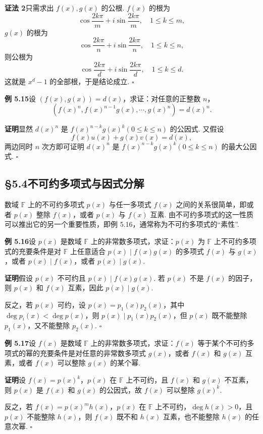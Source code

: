 \documentclass[UTF8, 12pt, fontset=fandol, oneside]{ctexart}
\begin{document}
\noindent\textbf{证法 2}\quad 只需求出 $f(x),g(x)$ 的公根. $f(x)$ 的根为
\[
\cos\frac{2k\pi}{m}+i\sin\frac{2k\pi}{m},\quad 1\le k\le m,
\]
$g(x)$ 的根为
\[
\cos\frac{2k\pi}{n}+i\sin\frac{2k\pi}{n},\quad 1\le k\le n,
\]
则公根为
\[
\cos\frac{2k\pi}{d}+i\sin\frac{2k\pi}{d},\quad 1\le k\le d.
\]
这就是 $x^d-1$ 的全部根，于是结论成立. \hfill $\square$

\noindent\textbf{例 5.15}\quad 设 $(f(x),g(x))=d(x)$，求证：对任意的正整数 $n$，
\[
(f(x)^n,f(x)^{n-1}g(x),\cdots,g(x)^n)=d(x)^n.
\]

\noindent\textbf{证明}\quad 显然 $d(x)^n$ 是 $f(x)^{n-k}g(x)^k(0\le k\le n)$ 的公因式. 又假设
\[
f(x)u(x)+g(x)v(x)=d(x),
\]
两边同时 $n$ 次方即可证明 $d(x)^n$ 是 $f(x)^{n-k}g(x)^k(0\le k\le n)$ 的最大公因式. \hfill $\square$

\subsection*{§5.4\quad 不可约多项式与因式分解}

数域 $\mathbb{F}$ 上的不可约多项式 $p(x)$ 与任一多项式 $f(x)$ 之间的关系很简单，即或者 $p(x)$ 整除 $f(x)$，或者 $p(x)$ 与 $f(x)$ 互素. 由不可约多项式的这一性质可以推出它的另一个重要性质，即例 5.16，通常称为不可约多项式的``素性''.

\noindent\textbf{例 5.16}\quad 设 $p(x)$ 是数域 $\mathbb{F}$ 上的非常数多项式，求证：$p(x)$ 为 $\mathbb{F}$ 上不可约多项式的充要条件是对 $\mathbb{F}$ 上任意适合 $p(x)\mid f(x)g(x)$ 的多项式 $f(x)$ 与 $g(x)$，或者 $p(x)\mid f(x)$，或者 $p(x)\mid g(x)$.

\noindent\textbf{证明}\quad 假设 $p(x)$ 不可约且 $p(x)\mid f(x)g(x)$. 若 $p(x)$ 不是 $f(x)$ 的因子，则 $p(x)$ 和 $f(x)$ 互素，因此 $p(x)\mid g(x)$.

反之，若 $p(x)$ 可约，设 $p(x)=p_1(x)p_2(x)$，其中 $\deg p_i(x)<\deg p(x)$，则 $p(x)\mid p_1(x)p_2(x)$，但 $p(x)$ 既不能整除 $p_1(x)$，又不能整除 $p_2(x)$. \hfill $\square$

\noindent\textbf{例 5.17}\quad 设 $f(x)$ 是数域 $\mathbb{F}$ 上的非常数多项式，求证：$f(x)$ 等于某个不可约多项式的幂的充要条件是对任意的非常数多项式 $g(x)$，或者 $f(x)$ 和 $g(x)$ 互素，或者 $f(x)$ 可以整除 $g(x)$ 的某个幂.

\noindent\textbf{证明}\quad 设 $f(x)=p(x)^k$，$p(x)$ 在 $\mathbb{F}$ 上不可约，且 $f(x)$ 和 $g(x)$ 不互素，则 $p(x)$ 是 $f(x)$ 和 $g(x)$ 的公因式，故 $f(x)$ 可以整除 $g(x)^k$.

反之，若 $f(x)=p(x)^m h(x)$，$p(x)$ 在 $\mathbb{F}$ 上不可约，$\deg h(x)>0$，且 $p(x)$ 不能整除 $h(x)$，则 $f(x)$ 既不和 $h(x)$ 互素，也不能整除 $h(x)$ 的任意次幂. \hfill $\square$
\end{document}
